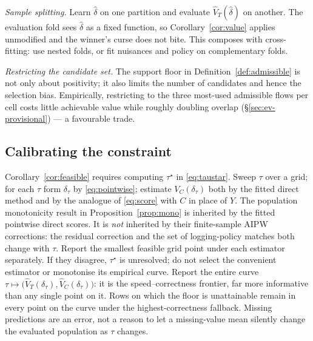 \documentclass[11pt,a4paper]{article}
\theoremstyle{plain}
\theoremstyle{definition}
\theoremstyle{remark}
\begin{document}
\emph{Sample splitting.} Learn $\hat\delta$ on one partition and evaluate $\hat V_T(\hat\delta)$
on another. The evaluation fold sees $\hat\delta$ as a fixed function, so
Corollary~\ref{cor:value} applies unmodified and the winner's curse does not bite. This composes
with cross-fitting: use nested folds, or fit nuisances and policy on complementary folds.

\emph{Restricting the candidate set.} The support floor in Definition~\ref{def:admissible} is
not only about positivity; it also limits the number of candidates and hence the selection bias.
Empirically, restricting to the three most-used admissible flows per cell costs little
achievable value while roughly doubling overlap (\S\ref{sec:ev-provisional}) --- a favourable
trade.

\subsection{Calibrating the constraint}\label{sec:tau}

Corollary~\ref{cor:feasible} requires computing $\tau^\star$ in \eqref{eq:taustar}. Sweep $\tau$
over a grid; for each $\tau$ form $\delta_\tau$ by \eqref{eq:pointwise}; estimate
$V_C(\delta_\tau)$ both by the fitted direct method and by the analogue of \eqref{eq:score}
with $C$ in place of $Y$. The population monotonicity result in
Proposition~\ref{prop:mono} is inherited by the fitted pointwise direct scores. It is \emph{not}
inherited by their finite-sample AIPW corrections: the residual correction and the set of
logging-policy matches both change with $\tau$. Report the smallest feasible grid point under
each estimator separately. If they disagree, $\tau^\star$ is unresolved; do not select the
convenient estimator or monotonise its empirical curve. Report the entire curve
$\tau\mapsto\bigl(\hat V_T(\delta_\tau),\hat V_C(\delta_\tau)\bigr)$: it is the
speed--correctness frontier, far more informative than any single point on it. Rows on which
the floor is unattainable remain in every point on the curve under the highest-correctness
fallback. Missing predictions are an error, not a reason to let a missing-value mean silently
change the evaluated population as $\tau$ changes.
\end{document}
